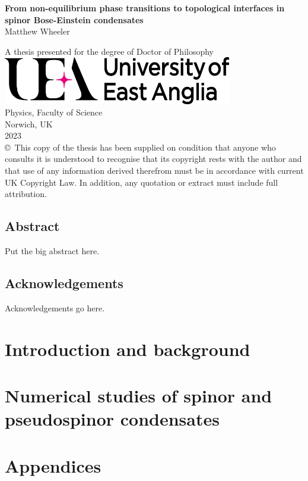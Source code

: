 \documentclass[a4paper, oneside, 11pt]{memoir}
\newlength\drop
\newcommand*\titleM{\begingroup%
\setlength\drop{0.08\textheight}
\centering
\vspace*{\drop}
{\LARGE\bfseries From non-equilibrium phase transitions to topological interfaces
in spinor Bose-Einstein condensates}\\[\baselineskip]
\vspace*{\drop}
{\Large Matthew Wheeler}\par
\vspace*{\drop}
{A thesis presented for the degree of Doctor of Philosophy}\\
\vspace*{1.4\drop}
\includegraphics[width=0.75\textwidth]{gfx/UEA_logo.png}\\
{Physics, Faculty of Science\\ Norwich, UK \\ 2023}\\
\vspace*{2.2\drop}
{\small \copyright \ This copy of the thesis has been supplied on condition that
anyone who  consults it is understood to recognise that its copyright rests with
the author and that use of any information derived therefrom must be in
accordance with current UK Copyright Law.
In addition, any quotation or extract must include full attribution.}
\endgroup}
\begin{document}
\begin{titlingpage}
    \titleM
\end{titlingpage}

\thispagestyle{empty}

\frontmatter
\chapter*{Abstract}
Put the big abstract here.

\newpage
\chapter*{Acknowledgements}
Acknowledgements go here.

\newpage
\tableofcontents

\newpage
\listoffigures

\clearpage


\mainmatter{}


\part{Introduction and background}




\part{Numerical studies of spinor and pseudospinor condensates}





\part{Appendices}
\appendix



\backmatter{}
\printbibliography{}
\end{document}
